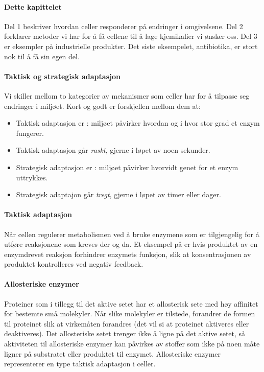 

\paragraph{Dette kapittelet} Del 1 beskriver hvordan celler responderer på endringer i omgivelsene. Del 2 forklarer metoder vi har for å få cellene til å lage kjemikalier vi ønsker oss. Del 3 er eksempler på industrielle produkter. Det siste eksempelet, antibiotika, er stort nok til å få sin egen del.


\paragraph{Taktisk og strategisk adaptasjon} Vi skiller mellom to kategorier av mekanismer som celler har for å tilpasse seg endringer i miljøet. Kort og godt er forskjellen mellom dem at:
\begin{itemize}[nolistsep,noitemsep]
	\item Taktisk adaptasjon er : miljøet påvirker hvordan og i hvor stor grad et enzym fungerer.
	\item Taktisk adaptasjon går \emph{raskt}, gjerne i løpet av noen sekunder.
	\item Strategisk adaptasjon er : miljøet påvirker hvorvidt genet for et enzym uttrykkes.
	\item Strategisk adaptajon går \emph{tregt}, gjerne i løpet av timer eller dager.
\end{itemize}

\paragraph{Taktisk adaptasjon} Når cellen regulerer metabolismen ved å bruke enzymene som er tilgjengelig for å utføre reaksjonene som kreves der og da. Et eksempel på  er hvis produktet av en enzymdrevet reaksjon forhindrer enzymets funksjon, slik at konsentrasjonen av produktet kontrolleres ved negativ feedback.

\paragraph{Allosteriske enzymer} Proteiner som i tillegg til det aktive setet har et allosterisk sete med høy affinitet for bestemte små molekyler. Når slike molekyler er tilstede, forandrer de formen til proteinet slik at virkemåten forandres (det vil si at proteinet aktiveres eller deaktiveres). Det allosteriske setet trenger ikke å ligne på det aktive setet, så aktiviteten til allosteriske enzymer kan påvirkes av stoffer som ikke på noen måte ligner på substratet eller produktet til enzymet. Allosteriske enzymer representerer en type taktisk adaptasjon i celler.


